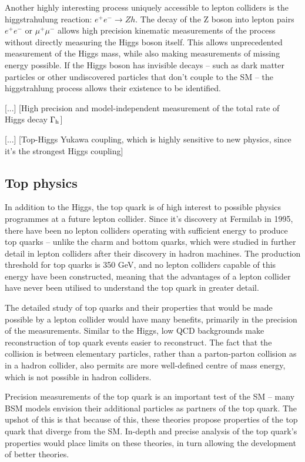 Another highly interesting process uniquely accessible to lepton colliders is the higgstrahulung reaction: $e^+ e^- \rightarrow Zh$. The decay of the Z boson into lepton pairs $e^+ e^-$ or $\mu^+ \mu^-$ allows high precision kinematic measurements of the process without directly measuring the Higgs boson itself. This allows unprecedented measurement of the Higgs mass, while also making measurements of missing energy possible. If the Higgs boson has invisible decays -- such as dark matter particles or other undiscovered particles that don't couple to the \acrshort{SM} -- the higgstrahlung process allows their existence to be identified.

[...] [High precision and model-independent measurement of the total rate of Higgs decay $\Gamma\textsubscript{h}$]

[...] [Top-Higgs Yukawa coupling, which is highly sensitive to new physics, since it's the strongest Higgs coupling]

\subsection{Top physics}
In addition to the Higgs, the top quark is of high interest to possible physics programmes at a future lepton collider. Since it's discovery at Fermilab in 1995, there have been no lepton colliders operating with sufficient energy to produce top quarks -- unlike the charm and bottom quarks, which were studied in further detail in lepton colliders after their discovery in hadron machines. The production threshold for top quarks is 350 GeV, and no lepton colliders capable of this energy have been constructed, meaning that the advantages of a lepton collider have never been utilised to understand the top quark in greater detail. 

The detailed study of top quarks and their properties that would be made possible by a lepton collider would have many benefits, primarily in the precision of the measurements. Similar to the Higgs, low \acrshort{QCD} backgrounds make reconstruction of top quark events easier to reconstruct. The fact that the collision is between elementary particles, rather than a parton-parton collision as in a hadron collider, also permits are more well-defined centre of mass energy, which is not possible in hadron colliders.

Precision measurements of the top quark is an important test of the \acrshort{SM} -- many \acrshort{BSM} models envision their additional particles as partners of the top quark. The upshot of this is that because of this, these theories propose properties of the top quark that diverge from the SM. In-depth and precise analysis of the top quark's properties would place limits on these theories, in turn allowing the development of better theories. 

